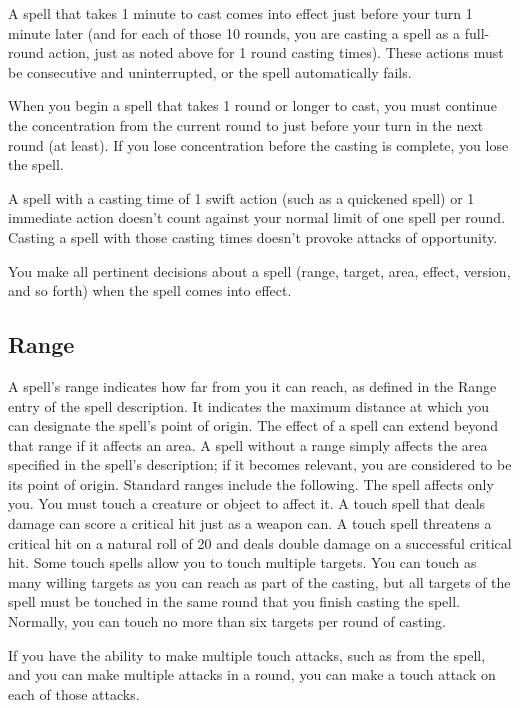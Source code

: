 A spell that takes 1 minute to cast comes into effect just before your turn 1 minute later (and for each of those 10 rounds, you are casting a spell as a full-round action, just as noted above for 1 round casting times). These actions must be consecutive and uninterrupted, or the spell automatically fails.

When you begin a spell that takes 1 round or longer to cast, you must continue the concentration from the current round to just before your turn in the next round (at least). If you lose concentration before the casting is complete, you lose the spell.

A spell with a casting time of 1 swift action (such as a quickened spell) or 1 immediate action doesn't count against your normal limit of one spell per round. Casting a spell with those casting times doesn't provoke attacks of opportunity.

You make all pertinent decisions about a spell (range, target, area, effect, version, and so forth) when the spell comes into effect.

\subsection{Range}
A spell's range indicates how far from you it can reach, as defined in the Range entry of the spell description. It indicates the maximum distance at which you can designate the spell's point of origin. The effect of a spell can extend beyond that range if it affects an area. A spell without a range simply affects the area specified in the spell's description; if it becomes relevant, you are considered to be its point of origin. Standard ranges include the following.
 The spell affects only you.
 You must touch a creature or object to affect it. A touch spell that deals damage can score a critical hit just as a weapon can. A touch spell threatens a critical hit on a natural roll of 20 and deals double damage on a successful critical hit. Some touch spells allow you to touch multiple targets. You can touch as many willing targets as you can reach as part of the casting, but all targets of the spell must be touched in the same round that you finish casting the spell. Normally, you can touch no more than six targets per round of casting.

If you have the ability to make multiple touch attacks, such as from the  spell, and you can make multiple attacks in a round, you can make a touch attack on each of those attacks.

